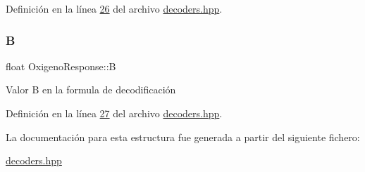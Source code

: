 Definición en la línea \hyperlink{decoders_8hpp_source_l00026}{26} del archivo \hyperlink{decoders_8hpp_source}{decoders.\+hpp}.

\mbox{\label{structOxigenoResponse_a96b19152dd001e19d1351e2d97f22736}} 
\subsubsection{\texorpdfstring{B}{B}}
{\footnotesize\ttfamily float Oxigeno\+Response\+::B}

Valor B en la formula de decodificación 

Definición en la línea \hyperlink{decoders_8hpp_source_l00027}{27} del archivo \hyperlink{decoders_8hpp_source}{decoders.\+hpp}.



La documentación para esta estructura fue generada a partir del siguiente fichero\+:\begin{DoxyCompactItemize}
\item 
\hyperlink{decoders_8hpp}{decoders.\+hpp}\end{DoxyCompactItemize}
